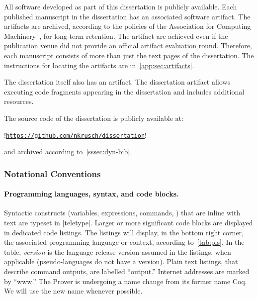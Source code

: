 All software developed as part of this dissertation is publicly available. Each
published manuscript in the dissertation has an associated software artifact.
The artifacts are archived, according to the policies of the Association for
Computing Machinery~\cite{acm_badging}, for long-term retention. The artifact
are achieved even if the publication venue did not provide an official artifact
evaluation round. Therefore, each manuscript consists of more than just the text
pages of the dissertation. The instructions for locating the artifacts are
in~\autoref{app:sec:artifacts}.

The dissertation itself also has an artifact. The dissertation artifact allows
executing code fragments appearing in the dissertation and includes additional
resources.

The source code of the dissertation is publicly available at:

\begin{center}
\begin{minipage}{\textwidth}
\begin{browserlisting}[nolol,escapeinside=!!]
!\href{https://github.com/nkrusch/dissertation}{\texttt{https://github.com/nkrusch/dissertation}}!
\end{browserlisting}
\end{minipage}
\end{center}

and archived according to~\autoref{sssec:dyn-bib}.

\subsubsection{Notational Conventions}

\paragraph*{Programming languages, syntax, and code blocks.}
Syntactic constructs (variables, expressions, commands, \etc) that are inline
with text are typeset in \pr|teletype|. Larger or more significant code blocks
are displayed in dedicated code listings. The listings will display, in the
bottom right corner, the associated programming language or context, according
to~\autoref{tab:pls}. In the table, \emph{version} is the language release
version assumed in the listings, when applicable (pseudo-languages do not have a
version). Plain text listings, that describe command outputs, are labelled
\enquote{output.} Internet addresses are marked by  \enquote{www.}
The  Prover is undergoing a name change from its former name
Coq. We will use the new name whenever possible.

